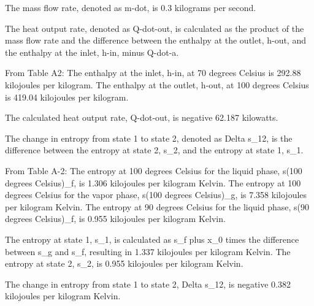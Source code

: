 The mass flow rate, denoted as m-dot, is 0.3 kilograms per second.

The heat output rate, denoted as Q-dot-out, is calculated as the product of the mass flow rate and the difference between the enthalpy at the outlet, h-out, and the enthalpy at the inlet, h-in, minus Q-dot-a.

From Table A2:
The enthalpy at the inlet, h-in, at 70 degrees Celsius is 292.88 kilojoules per kilogram.
The enthalpy at the outlet, h-out, at 100 degrees Celsius is 419.04 kilojoules per kilogram.

The calculated heat output rate, Q-dot-out, is negative 62.187 kilowatts.

The change in entropy from state 1 to state 2, denoted as Delta s_12, is the difference between the entropy at state 2, s_2, and the entropy at state 1, s_1.

From Table A-2:
The entropy at 100 degrees Celsius for the liquid phase, s(100 degrees Celsius)_f, is 1.306 kilojoules per kilogram Kelvin.
The entropy at 100 degrees Celsius for the vapor phase, s(100 degrees Celsius)_g, is 7.358 kilojoules per kilogram Kelvin.
The entropy at 90 degrees Celsius for the liquid phase, s(90 degrees Celsius)_f, is 0.955 kilojoules per kilogram Kelvin.

The entropy at state 1, s_1, is calculated as s_f plus x_0 times the difference between s_g and s_f, resulting in 1.337 kilojoules per kilogram Kelvin.
The entropy at state 2, s_2, is 0.955 kilojoules per kilogram Kelvin.

The change in entropy from state 1 to state 2, Delta s_12, is negative 0.382 kilojoules per kilogram Kelvin.